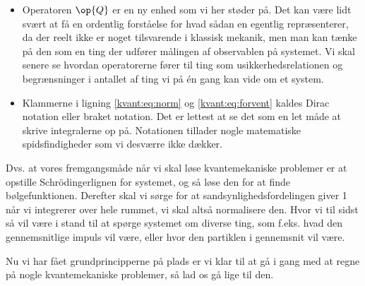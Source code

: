 \begin{itemize}
\item Operatoren $\op{Q}$ er en ny enhed som vi her støder på. Det kan være lidt svært at få en ordentlig forståelse for hvad sådan en egentlig repræsenterer, da der reelt ikke er noget tilsvarende i klassisk mekanik, men man kan tænke på den som en ting der udfører målingen af observablen på systemet. Vi skal senere se hvordan operatorerne fører til ting som usikkerhedsrelationen og begrænsninger i antallet af ting vi på én gang kan vide om et system.

\item Klammerne i ligning \eqref{kvant:eq:norm} og \eqref{kvant:eq:forvent} kaldes Dirac notation eller braket notation. Det er lettest at se det som en let måde at skrive integralerne op på. Notationen tillader nogle matematiske spidsfindigheder som vi desværre ikke dækker.

\end{itemize}
Dvs. at vores fremgangsmåde når vi skal løse kvantemekaniske problemer er at opstille Schrödingerlignen for systemet, og så løse den for at finde bølgefunktionen. Derefter skal vi sørge for at sandsynlighedsfordelingen giver 1 når vi integrerer over hele rummet, vi skal altså normalisere den. Hvor vi til sidst så vil være i stand til at spørge systemet om diverse ting, som f.eks. hvad den gennemsnitlige impuls vil være, eller hvor den partiklen i gennemsnit vil være.

Nu vi har fået grundprincipperne på plads er vi klar til at gå i gang med at regne på nogle kvantemekaniske problemer, så lad os gå lige til den.


